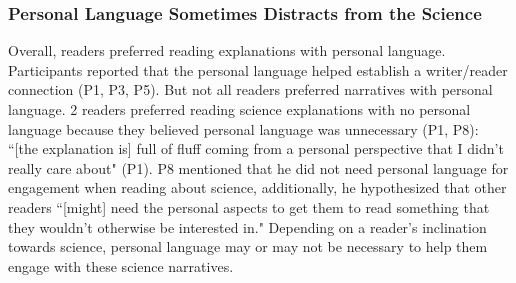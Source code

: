  \subsubsection{Personal Language Sometimes Distracts from the Science}
 Overall, readers preferred reading explanations with personal language. Participants reported that the personal language helped establish a writer/reader connection (P1, P3, P5). But not all readers preferred narratives with personal language. 2 readers preferred reading science explanations with no personal language because they believed personal language was unnecessary (P1, P8): ``[the explanation is] full of fluff coming from a personal perspective that I didn’t really care about" (P1). P8 mentioned that he did not need personal language for engagement when reading about science, additionally, he hypothesized that other readers ``[might] need the personal aspects to get them to read something that they wouldn't otherwise be interested in." Depending on a reader's inclination towards science, personal language may or may not be necessary to help them engage with these science narratives. 

 


 

 
 

